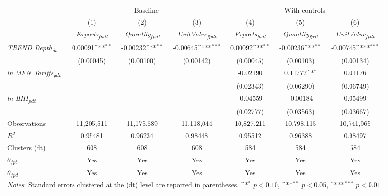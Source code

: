 {
\def\sym#1{\ifmmode^{#1}\else\(^{#1}\)\fi}
\begin{tabular}{l*{6}{c}}
\toprule
&\multicolumn{3}{c}{Baseline}&\multicolumn{3}{c}{With controls}\\\cmidrule(lr){2-4}\cmidrule(lr){5-7}
&(1)&(2)&(3)&(4)&(5)&(6)\\
&\textit{Exports\textsubscript{fpdt}}&\textit{Quantity\textsubscript{fpdt}}&\textit{UnitValue\textsubscript{fpdt}}&\textit{Exports\textsubscript{fpdt}}&\textit{Quantity\textsubscript{fpdt}}&\textit{UnitValue\textsubscript{fpdt}}\\
\midrule
\textit{TREND Depth\textsubscript{dt}} & 0.00091\sym{**} & -0.00232\sym{**} & -0.00645\sym{***} & 0.00092\sym{**} & -0.00236\sym{**} & -0.00745\sym{***}\\
 & (0.00045) & (0.00100) & (0.00142) & (0.00045) & (0.00103) & (0.00134)\\
\addlinespace
\textit{ln MFN Tariffs\textsubscript{pdt}} &  &  &  & -0.02190 & 0.11772\sym{*} & 0.01176\\
 &  &  &  & (0.02343) & (0.06290) & (0.06749)\\
\addlinespace
\textit{ln HHI\textsubscript{pdt}} &  &  &  & -0.04559 & -0.00184 & 0.05499\\
 &  &  &  & (0.02777) & (0.03563) & (0.03667)\\
\midrule
Observations & 11,205,511 & 11,175,689 & 11,118,044 & 10,827,211 & 10,798,115 & 10,741,965\\
$R^{2}$ & 0.95481 & 0.96234 & 0.98448 & 0.95512 & 0.96388 & 0.98497\\
Clusters (dt) & 608 & 608 & 608 & 584 & 584 & 584\\
$\theta_{fpt}$ & Yes & Yes & Yes & Yes & Yes & Yes\\
$\theta_{fpd}$ & Yes & Yes & Yes & Yes & Yes & Yes\\
\bottomrule
\multicolumn{7}{l}{\footnotesize \textit{Notes}: Standard errors clustered at the (dt) level are reported in parentheses. \sym{*} \(p<0.10\), \sym{**} \(p<0.05\), \sym{***} \(p<0.01\)}\\
\end{tabular}
}
